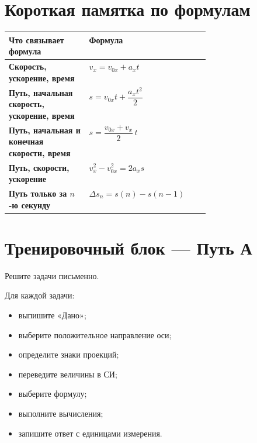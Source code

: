 \documentclass[a4paper,12pt]{article}
\begin{document}

\section*{Короткая памятка по формулам}

\begin{center}

\begin{tabularx}{\linewidth}{
  @{}
  >{\bfseries}p{0.40\linewidth}
  X
  @{}
}

\toprule

Что связывает формула
&
Формула
\\

\midrule

Скорость, ускорение, время
&
$v_x=v_{0x}+a_xt$
\\

Путь, начальная скорость, ускорение, время
&
$s=v_{0x}t+\dfrac{a_xt^2}{2}$
\\

Путь, начальная и конечная скорости, время
&
$s=\dfrac{v_{0x}+v_x}{2}\,t$
\\

Путь, скорости, ускорение
&
$v_x^2-v_{0x}^2=2a_xs$
\\

Путь только за $n$-ю секунду
&
$\Delta s_n=s(n)-s(n-1)$
\\

\bottomrule

\end{tabularx}

\end{center}


\clearpage

\section*{Тренировочный блок --- Путь А}

Решите задачи письменно.

Для каждой задачи:

\begin{itemize}
  \item выпишите «Дано»;
  \item выберите положительное направление оси;
  \item определите знаки проекций;
  \item переведите величины в СИ;
  \item выберите формулу;
  \item выполните вычисления;
  \item запишите ответ с единицами измерения.
\end{itemize}
\end{document}
